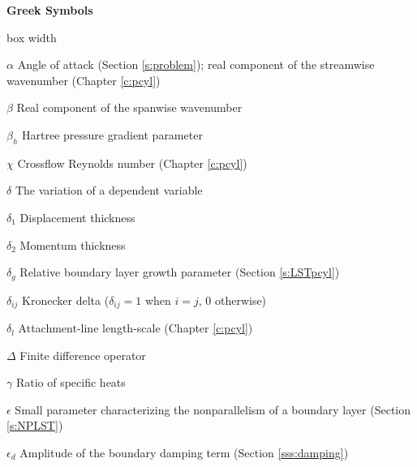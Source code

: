 \bigskip
\centerline{\Large\bf Greek Symbols}

\begin{descriptionlist}{box width}

\item[$\alpha$]         Angle of attack (Section \ref{s:problem});
                        real component of the streamwise wavenumber (Chapter
                        \ref{c:pcyl})

\item[$\beta$]		Real component of the spanwise wavenumber

\item[$\beta_h$]	Hartree pressure gradient parameter

\item[$\chi$]		Crossflow Reynolds number (Chapter \ref{c:pcyl})

\item[$\delta$] 	The variation of a dependent variable

\item[$\delta_1$]	Displacement thickness

\item[$\delta_2$]	Momentum thickness

\item[$\delta_g$]	Relative boundary layer growth parameter
                        (Section \ref{s:LSTpcyl})

\item[$\delta_{ij}$]	Kronecker delta ($\delta_{ij} = 1$ when $i=j$, 
                        $0$ otherwise)

\item[$\delta_l$]	Attachment-line length-scale (Chapter \ref{c:pcyl})

\item[$\Delta$]		Finite difference operator

\item[$\gamma$]         Ratio of specific heats

\item[$\epsilon$]	Small parameter characterizing the 
                        nonparallelism of a boundary layer 
			(Section \ref{s:NPLST})

\item[$\epsilon_d$]	Amplitude of the boundary damping term 
                        (Section \ref{sss:damping})



\end{descriptionlist}
